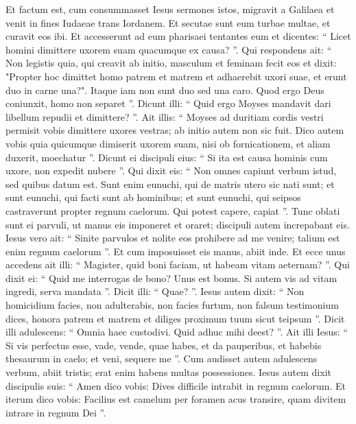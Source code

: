 \begin{biblechapter}
\begin{biblechapter}
\begin{biblechapter}
\begin{biblechapter}
\begin{biblechapter}
\begin{biblechapter}
\begin{biblechapter}
\begin{biblechapter}
\begin{biblechapter}
\begin{biblechapter}
\begin{biblechapter}
\begin{biblechapter}
\begin{biblechapter}
\begin{biblechapter}
\begin{biblechapter}
\begin{biblechapter}
\begin{biblechapter}
\begin{biblechapter}
\begin{biblechapter}
\verse Et factum est, cum consummasset Iesus sermones istos, migravit a Galilaea et venit in fines Iudaeae trans Iordanem. 
\verse Et secutae sunt eum turbae multae, et curavit eos ibi.
 \verse Et accesserunt ad eum pharisaei tentantes eum et dicentes: “ Licet homini dimittere uxorem suam quacumque ex causa? ”. 
\verse Qui respondens ait: “ Non legistis quia, qui creavit ab initio, masculum et feminam fecit eos 
\verse et dixit: "Propter hoc dimittet homo patrem et matrem et adhaerebit uxori suae, et erunt duo in carne una?". 
\verse Itaque iam non sunt duo sed una caro. Quod ergo Deus coniunxit, homo non separet ”. 
\verse Dicunt illi: “ Quid ergo Moyses mandavit dari libellum repudii et dimittere? ”. 
\verse Ait illis: “ Moyses ad duritiam cordis vestri permisit vobis dimittere uxores vestras; ab initio autem non sic fuit. 
\verse Dico autem vobis quia quicumque dimiserit uxorem suam, nisi ob fornicationem, et aliam duxerit, moechatur ”.
 \verse Dicunt ei discipuli eius: “ Si ita est causa hominis cum uxore, non expedit nubere ”. 
\verse Qui dixit eis: “ Non omnes capiunt verbum istud, sed quibus datum est. 
\verse Sunt enim eunuchi, qui de matris utero sic nati sunt; et sunt eunuchi, qui facti sunt ab hominibus; et sunt eunuchi, qui seipsos castraverunt propter regnum caelorum. Qui potest capere, capiat ”.
 \verse Tunc oblati sunt ei parvuli, ut manus eis imponeret et oraret; discipuli autem increpabant eis. 
\verse Iesus vero ait: “ Sinite parvulos et nolite eos prohibere ad me venire; talium est enim regnum caelorum ”. 
\verse Et cum imposuisset eis manus, abiit inde.
 \verse Et ecce unus accedens ait illi: “ Magister, quid boni faciam, ut habeam vitam aeternam? ”. Qui dixit ei: 
\verse “ Quid me interrogas de bono? Unus est bonus. Si autem vis ad vitam ingredi, serva mandata ”.
 \verse Dicit illi: “ Quae? ”. Iesus autem dixit: “ Non homicidium facies, non adulterabis, non facies furtum, non falsum testimonium dices, 
\verse honora patrem et matrem et diliges proximum tuum sicut teipsum ”. 
\verse Dicit illi adulescens: “ Omnia haec custodivi. Quid adhuc mihi deest? ”. 
\verse Ait illi Iesus: “ Si vis perfectus esse, vade, vende, quae habes, et da pauperibus, et habebis thesaurum in caelo; et veni, sequere me ”. 
\verse Cum audisset autem adulescens verbum, abiit tristis; erat enim habens multas possessiones.
 \verse Iesus autem dixit discipulis suis: “ Amen dico vobis: Dives difficile intrabit in regnum caelorum. 
\verse Et iterum dico vobis: Facilius est camelum per foramen acus transire, quam divitem intrare in regnum Dei ”. 

\end{biblechapter}
\end{biblechapter}
\end{biblechapter}
\end{biblechapter}
\end{biblechapter}
\end{biblechapter}
\end{biblechapter}
\end{biblechapter}
\end{biblechapter}
\end{biblechapter}
\end{biblechapter}
\end{biblechapter}
\end{biblechapter}
\end{biblechapter}
\end{biblechapter}
\end{biblechapter}
\end{biblechapter}
\end{biblechapter}
\end{biblechapter}
